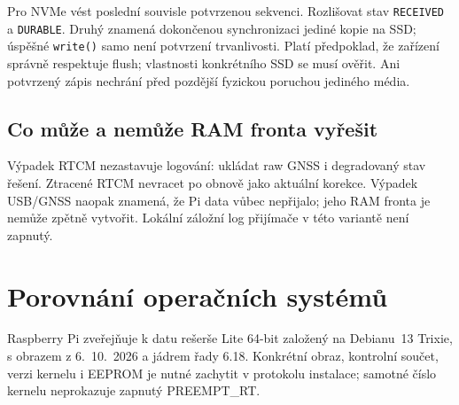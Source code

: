 \documentclass[11pt,a4paper]{article}
\newcommand{\novastrana}{\clearpage}
\begin{document}
Pro NVMe vést poslední souvisle potvrzenou sekvenci. Rozlišovat stav \texttt{RECEIVED} a \texttt{DURABLE}. Druhý znamená dokončenou synchronizaci jediné kopie na SSD; úspěšné \texttt{write()} samo není potvrzení trvanlivosti. Platí předpoklad, že zařízení správně respektuje flush; vlastnosti konkrétního SSD se musí ověřit. Ani potvrzený zápis nechrání před pozdější fyzickou poruchou jediného média.\cite{fsync,micron}

\subsection{Co může a nemůže RAM fronta vyřešit}
Výpadek RTCM nezastavuje logování: ukládat raw GNSS i degradovaný stav řešení. Ztracené RTCM nevracet po obnově jako aktuální korekce. Výpadek USB/GNSS naopak znamená, že Pi data vůbec nepřijalo; jeho RAM fronta je nemůže zpětně vytvořit. Lokální záložní log přijímače v této variantě není zapnutý.

\novastrana
\section{Porovnání operačních systémů}
Raspberry Pi zveřejňuje k datu rešerše Lite 64-bit založený na Debianu~13 Trixie, s obrazem z 6.~10.~2026 a jádrem řady 6.18. Konkrétní obraz, kontrolní součet, verzi kernelu i EEPROM je nutné zachytit v protokolu instalace; samotné číslo kernelu neprokazuje zapnutý PREEMPT\_RT.\cite{rpos}
\end{document}
